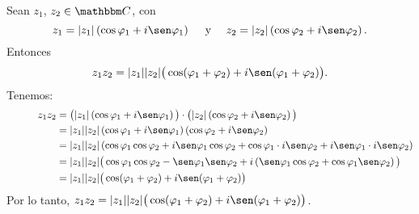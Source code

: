 \begin{theorem}
    Sean $z_1$, $z_2 \in \CC$, con
    $$z_1=|z_1| \left( \cos \varphi _1 +i \sen \varphi _1 \right) \quad \text{ y } \quad z_2=|z_2| \left( \cos \varphi _2 +i \sen \varphi _2 \right).$$
    Entonces
    $$z_1z_2=|z_1||z_2|\big( \cos (\varphi _1+ \varphi _2 )+i \sen (\varphi _1+\varphi _2) \big).$$
    \demostracion Tenemos:
    \begin{align*}
        \quad\quad\quad z_1z_2 &=\big( |z_1|\left( \cos \varphi _1 +i \sen \varphi _1 \right) \big) \cdot \big( |z_2|\left( \cos \varphi _2 +i \sen \varphi _2 \right) \big) \\
        &=|z_1||z_2| \left( \cos \varphi _1 +i \sen \varphi _1 \right) \left( \cos \varphi _2 +i \sen \varphi _2 \right) \\
        &=|z_1||z_2| \left( \cos \varphi _1 \cos \varphi _2 +i \sen \varphi _1 \cos \varphi _2 + \cos \varphi _1 \cdot i \sen \varphi _2 +i \sen \varphi _1 \cdot i \sen \varphi _2 \right) \\
        &=|z_1||z_2| \big( \cos \varphi _1 \cos \varphi _2 - \sen \varphi _1 \sen \varphi _2+i \left( \sen \varphi _1 \cos \varphi _2 + \cos \varphi _1 \sen \varphi _2 \right) \big) \\
        &=|z_1||z_2| \big( \cos (\varphi _1 + \varphi _2 )+i \sen (\varphi _1+\varphi _2 ) \big)
    \end{align*}
    Por lo tanto, $z_1z_2=|z_1||z_2|\big( \cos (\varphi _1+ \varphi _2 )+i \sen (\varphi _1+\varphi _2) \big)$.
\end{theorem}

